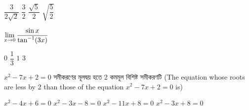 \documentclass[addpoints]{exam}
\begin{document}
\begin{questions}
\begin{oneparchoices}
\choice $ \dfrac{3}{2\sqrt{2}} $
\choice $ \dfrac{3}{2} $
\choice $ \dfrac{\sqrt{5}}{2} $
\choice  $ \sqrt{\dfrac{5}{2}} $

\end{oneparchoices}

\question  $ \mathlarger{\lim_{x \to 0} \dfrac{\sin x}{\tan^{-1}(3x)}} $

\begin{oneparchoices}
\choice $ 0 $
\choice $ \dfrac{1}{3} $
\choice $ 1 $
\choice  $ 3 $

\end{oneparchoices}

\question   $ x^{2}-7x+2=0 $ সমীকরণের মূলদ্বয় হতে 2 কমমূল বিশিষ্ট সমীকরণটি (The equation whose roots are less by 2 than those of the equation $ x^{2}-7x+2=0 $ is)

\begin{oneparchoices}
\choice $ x^{2}-4x+6=0 $
\choice $ x^{2}-3x-8=0 $
\choice $ x^{2}-11x+8=0 $
\choice $ x^{2}-3x+8=0 $

\end{oneparchoices}

\end{questions}
\end{document}
